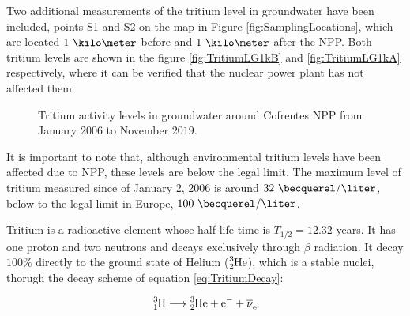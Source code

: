 Two additional measurements of the tritium level in groundwater have been included, points S1 and S2 on the map in Figure \ref{fig:SamplingLocations}, which are located $1~\kilo\meter$ before and $1~\kilo\meter$ after the NPP. Both tritium levels are shown in the figure \ref{fig:TritiumLG1kB} and \ref{fig:TritiumLG1kA} respectively, where it can be verified that the nuclear power plant has not affected them.

\begin{figure}[hbtp]
 \centering
 \caption{Tritium activity levels in groundwater around Cofrentes NPP from January $2006$ to November $2019$.~\cite{REM}}
 \label{fig:MeasurementsCofrentesGroundWater}
\end{figure}

It is important to note that, although environmental tritium levels have been affected due to NPP, these levels are below the legal limit. The maximum level of tritium measured since of January 2, 2006 is around $32~\becquerel/\liter$, below to the legal limit in Europe, $100~\becquerel/\liter$.

Tritium is a radioactive element whose half-life time is $T_{1/2}= 12.32$ years. It has one proton and two neutrons and decays exclusively through $\beta$ radiation. It decay $100\%$ directly to the ground state of Helium ($\ce{^{3}_{2}He}$), which is a stable nuclei, thorugh the decay scheme of equation \ref{eq:TritiumDecay}:





\begin{equation}
\ce{^{3}_{1}H} \longrightarrow \ce{^{3}_{2}He}  + \ce{e^-}  + \ce{\overline{\nu}_e}
\label{eq:TritiumDecay}
\end{equation}

